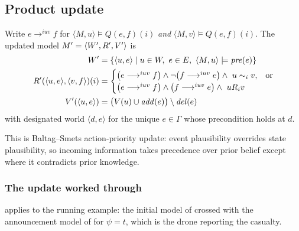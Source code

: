\documentclass[11pt,a4paper]{article}
\begin{document}
\subsection{Product update}

\begin{definition}
\label{def:update}
Write $e \longrightarrow^{iuv} f$ for $\langle M,u\rangle \models Q(e,f)(i)$ \emph{and}
$\langle M,v\rangle \models Q(e,f)(i)$. The updated model $M' = \langle W', R',
V'\rangle$ is
\begin{align}
  W' &= \{\langle u,e\rangle \mid u \in W,\ e \in E,\
    \langle M,u\rangle \models \mathit{pre}(e)\} \\
  R'(\langle u,e\rangle,\langle v,f\rangle)(i) &=
    \begin{cases}
      \big(e \longrightarrow^{iuv} f\big) \wedge \neg\big(f \longrightarrow^{iuv} e\big)
        \wedge\ u \sim_{i} v, & \text{or} \\
      \big(e \longrightarrow^{iuv} f\big) \wedge \big(f \longrightarrow^{iuv} e\big)
        \wedge\ u R_{i} v &
    \end{cases}\\
  V'(\langle u,e\rangle) &= \big(V(u) \cup \mathit{add}(e)\big) \setminus \mathit{del}(e)
\end{align}
with designated world $\langle d, e\rangle$ for the unique $e \in \Gamma$ whose precondition
holds at $d$.
\end{definition}

This is Baltag--Smets action-priority update: event plausibility overrides state plausibility,
so incoming information takes precedence over prior belief except where it contradicts prior
knowledge.

\subsubsection{The update worked through}
\label{sec:worked}

 applies  to the running example: the initial model of
\Cref{fig:sar} crossed with the announcement model of \Cref{fig:events} for $\psi = t$,
which is the drone reporting the casualty.
\end{document}
